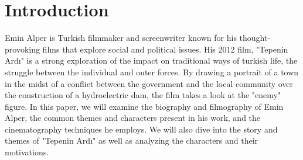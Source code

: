 \documentclass[12pt]{article}
\begin{document}
\maketitle

\section{Introduction}

\par
Emin Alper is Turkish filmmaker and screenwriter known for his thought-provoking films that explore social and political issues.
His 2012 film, "Tepenin Ardı" is a strong exploration of the impact on traditional ways of turkish life, the struggle between the individual and outer forces.
By drawing a portrait of a town in the midst of a conflict between the government and the local community over the construction of a hydroelectric dam, the film takes a look at the "enemy" figure.
In this paper, we will examine the biography and filmography of Emin Alper, the common themes and characters present in his work, and the cinematography techniques he employs.
We will also dive into the story and themes of "Tepenin Ardı" as well as analyzing the characters and their motivations.
\\
\end{document}
